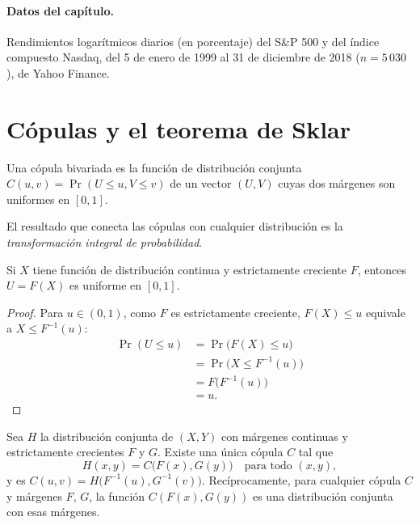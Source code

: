 \paragraph{Datos del capítulo.} Rendimientos logarítmicos diarios (en porcentaje) del S\&P 500 y del índice compuesto
Nasdaq, del 5 de enero de 1999 al 31 de diciembre de 2018 ($n=5\,030$), de Yahoo Finance.

\section{Cópulas y el teorema de Sklar}

\begin{definicion}[Cópula]
Una cópula bivariada es la función de distribución conjunta $C(u,v)=\Pr(U\le u,V\le v)$ de un vector $(U,V)$ cuyas dos
márgenes son uniformes en $[0,1]$.
\end{definicion}

El resultado que conecta las cópulas con cualquier distribución es la \emph{transformación integral de probabilidad}.

\begin{proposicion}\label{prop:tip}
Si $X$ tiene función de distribución continua y estrictamente creciente $F$, entonces $U=F(X)$ es uniforme en $[0,1]$.
\end{proposicion}

\begin{proof}
Para $u\in(0,1)$, como $F$ es estrictamente creciente, $F(X)\le u$ equivale a $X\le F^{-1}(u)$:
\begin{align*}
  \Pr(U\le u) &= \Pr\bigl(F(X)\le u\bigr)\\
              &= \Pr\bigl(X\le F^{-1}(u)\bigr)\\
              &= F\bigl(F^{-1}(u)\bigr)\\
              &= u .
\end{align*}
\end{proof}

\begin{proposicion}\label{prop:sklar}
Sea $H$ la distribución conjunta de $(X,Y)$ con márgenes continuas y estrictamente crecientes $F$ y $G$. Existe una única
cópula $C$ tal que
\[
  H(x,y)=C\bigl(F(x),G(y)\bigr)\quad\text{para todo }(x,y),
\]
y es $C(u,v)=H\bigl(F^{-1}(u),G^{-1}(v)\bigr)$. Recíprocamente, para cualquier cópula $C$ y márgenes $F$, $G$, la
función $C(F(x),G(y))$ es una distribución conjunta con esas márgenes.
\end{proposicion}

